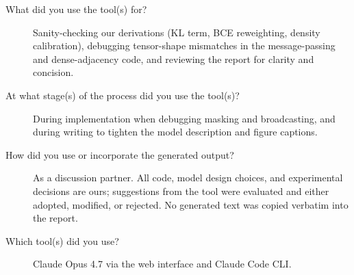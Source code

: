 \documentclass[10pt,a4paper]{article}
\begin{document}
\newpage

\begin{description}
\item[What did you use the tool(s) for?] Sanity-checking our derivations (KL term, BCE reweighting, density calibration), debugging tensor-shape mismatches in the message-passing and dense-adjacency code, and reviewing the report for clarity and concision.
\item[At what stage(s) of the process did you use the tool(s)?] During implementation when debugging masking and broadcasting, and during writing to tighten the model description and figure captions.
\item[How did you use or incorporate the generated output?] As a discussion partner. All code, model design choices, and experimental decisions are ours; suggestions from the tool were evaluated and either adopted, modified, or rejected. No generated text was copied verbatim into the report.
\item[Which tool(s) did you use?] Claude Opus 4.7 via the web interface and Claude Code CLI.
\end{description}

\newpage


\end{document}

